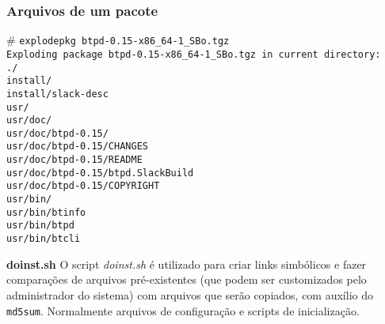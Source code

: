 \documentclass{beamer}
\begin{document}
\begin{frame}
	\frametitle{Arquivos de um pacote}
	\scriptsize{
	\# \texttt{explodepkg btpd-0.15-x86\_64-1\_SBo.tgz\\
	Exploding package btpd-0.15-x86\_64-1\_SBo.tgz in current directory:\\
	./\\
	install/\\
	install/slack-desc\\
	usr/\\
	usr/doc/\\
	usr/doc/btpd-0.15/\\
	usr/doc/btpd-0.15/CHANGES\\
	usr/doc/btpd-0.15/README\\
	usr/doc/btpd-0.15/btpd.SlackBuild\\
	usr/doc/btpd-0.15/COPYRIGHT\\
	usr/bin/\\
	usr/bin/btinfo\\
	usr/bin/btpd\\
	usr/bin/btcli\\
	}}
	\begin{block}{\bf{doinst.sh}}
	O script \textit{doinst.sh} é utilizado para criar links simbólicos e fazer
	comparações de arquivos pré-existentes (que podem ser customizados pelo
	administrador do sistema) com arquivos que serão copiados, com auxílio do
	\texttt{md5sum}. Normalmente arquivos de configuração e scripts de inicialização.
	\end{block}
\end{frame}
\end{document}
